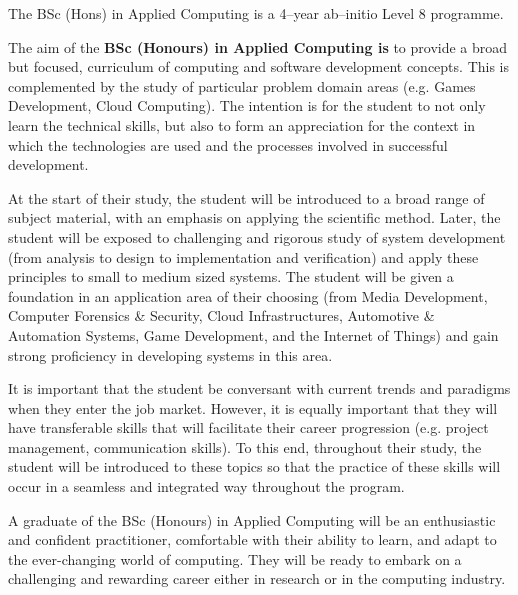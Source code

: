 \documentclass[openany]{report}
\begin{document}

\vspace{-40pt}

The BSc (Hons) in Applied Computing is a 4--year ab--initio Level 8 programme.

\vspace{0.25cm}
\begin{programmeAim}{The aim of the \textbf{BSc (Honours) in Applied Computing is}} to provide a broad but focused, curriculum of computing and software development concepts. This is complemented by the study of particular problem domain areas (e.g. Games Development, Cloud Computing). The intention is for the student to not only learn the technical skills, but also to form an appreciation for the context in which the technologies are used and the processes involved in successful development. 

At the start of their study, the student will be introduced to a broad range of subject material, with an emphasis on applying the scientific method. Later, the student will be exposed to challenging and rigorous study of system development (from analysis to design to implementation and verification) and apply these principles to small to medium sized systems. The student will be given a foundation in an application area of their choosing (from Media Development, Computer Forensics \& Security, Cloud Infrastructures, Automotive \& Automation Systems, Game Development,  and the Internet of Things) and gain strong proficiency in developing systems in this area. 

It is important that the student be conversant with current trends and paradigms when they enter the job market. However, it is equally important that they will have transferable skills that will facilitate their career progression (e.g. project management, communication skills). To this end, throughout their study, the student will be introduced to these topics so that the practice of these skills will occur in a seamless and integrated way throughout the program. 

A graduate of the BSc (Honours) in Applied Computing will be an enthusiastic and confident practitioner, comfortable with their ability to learn, and adapt to the ever-changing world of computing. They will be ready to embark on a challenging and rewarding career either in research or in the computing industry.
\end{programmeAim}
\end{document}
